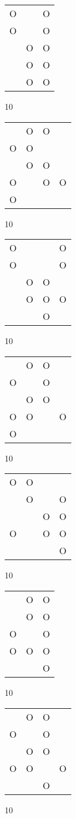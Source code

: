 \begin{tabular}{|m{0.2cm}m{0.2cm}m{0.2cm}|}\hline
O& &O\\
O& &O\\
 &O&O\\
 &O&O\\
 &O&O\\
\hline\end{tabular}10
\begin{tabular}{|m{0.2cm}m{0.2cm}m{0.2cm}m{0.2cm}|}\hline
 &O&O& \\
O&O& & \\
 &O&O& \\
O& &O&O\\
O& & & \\
\hline\end{tabular}10
\begin{tabular}{|m{0.2cm}m{0.2cm}m{0.2cm}m{0.2cm}|}\hline
O& & &O\\
O& & &O\\
 &O&O& \\
 &O&O&O\\
 & &O& \\
\hline\end{tabular}10
\begin{tabular}{|m{0.2cm}m{0.2cm}m{0.2cm}m{0.2cm}|}\hline
 &O&O& \\
O& &O& \\
 &O&O& \\
O&O& &O\\
O& & & \\
\hline\end{tabular}10
\begin{tabular}{|m{0.2cm}m{0.2cm}m{0.2cm}m{0.2cm}|}\hline
O&O& & \\
 &O& &O\\
 & &O&O\\
O& &O&O\\
 & & &O\\
\hline\end{tabular}10
\begin{tabular}{|m{0.2cm}m{0.2cm}m{0.2cm}|}\hline
 &O&O\\
 &O&O\\
O& &O\\
O&O&O\\
 & &O\\
\hline\end{tabular}10
\begin{tabular}{|m{0.2cm}m{0.2cm}m{0.2cm}m{0.2cm}|}\hline
 &O&O& \\
O& &O& \\
 &O&O& \\
O&O& &O\\
 & &O& \\
\hline\end{tabular}10
